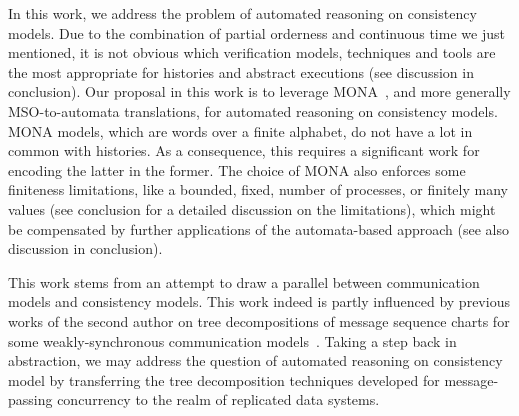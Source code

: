In this work, we address the problem of automated reasoning on consistency models. Due to the combination of partial orderness and continuous time we just mentioned, it is not obvious which verification models, techniques and tools are the most appropriate for histories and abstract executions (see discussion in conclusion).
Our proposal in this work is to leverage MONA~\cite{MONAguide},  and more generally  MSO-to-automata translations, for automated reasoning on consistency models. MONA models, which are words over a finite alphabet, do not have a lot in common with histories. As a consequence, this requires a significant work for encoding the latter in the former. The choice of MONA also enforces some finiteness limitations, like a bounded, fixed, number of processes, or finitely many values (see conclusion for a detailed discussion on the limitations), which might be compensated by further applications of the automata-based approach (see also discussion in conclusion).

This work stems from an attempt to draw a parallel between communication models and consistency models. This work indeed is partly influenced by previous works of the second author on tree decompositions of message sequence charts for some weakly-synchronous communication models~\cite{DBLP:journals/pacmpl/GiustoFLL23}. Taking a step back in abstraction, we may address the question of automated reasoning on consistency model by transferring the tree decomposition techniques developed for message-passing concurrency to the realm of replicated data systems.

